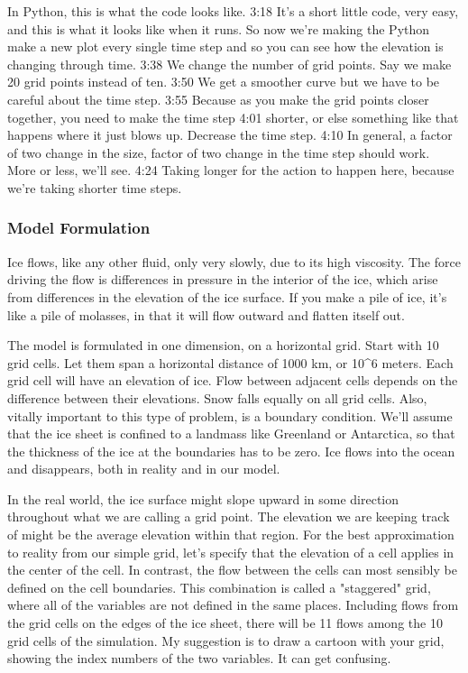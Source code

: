 {In Python, this is what the code looks like. 
3:18
It's a short little code, very easy, and this is what it looks like when it runs. So now we're making the Python make a new plot every single time step and so you can see how the elevation is changing through time. 
3:38
We change the number of grid points. Say we make 20 grid points instead of ten. 
3:50
We get a smoother curve but we have to be careful about the time step. 
3:55
Because as you make the grid points closer together, you need to make the time step 
4:01
shorter, or else something like that happens where it just blows up. Decrease the time step. 
4:10
In general, a factor of two change in the size, factor of two change in the time step should work. More or less, we'll see. 
4:24
Taking longer for the action to happen here, because we're taking shorter time steps. 

\subsubsection{Model Formulation}\index{}
Ice flows, like any other fluid, only very slowly, due to its high viscosity. The force driving the flow is differences in pressure in the interior of the ice, which arise from differences in the elevation of the ice surface. If you make a pile of ice, it's like a pile of molasses, in that it will flow outward and flatten itself out.

The model is formulated in one dimension, on a horizontal grid. Start with 10 grid cells. Let them span a horizontal distance of 1000 km, or 10^6 meters. Each grid cell will have an elevation of ice. Flow between adjacent cells depends on the difference between their elevations. Snow falls equally on all grid cells. Also, vitally important to this type of problem, is a boundary condition. We'll assume that the ice sheet is confined to a landmass like Greenland or Antarctica, so that the thickness of the ice at the boundaries has to be zero. Ice flows into the ocean and disappears, both in reality and in our model.

In the real world, the ice surface might slope upward in some direction throughout what we are calling a grid point. The elevation we are keeping track of might be the average elevation within that region. For the best approximation to reality from our simple grid, let's specify that the elevation of a cell applies in the center of the cell. In contrast, the flow between the cells can most sensibly be defined on the cell boundaries. This combination is called a "staggered" grid, where all of the variables are not defined in the same places. Including flows from the grid cells on the edges of the ice sheet, there will be 11 flows among the 10 grid cells of the simulation. My suggestion is to draw a cartoon with your grid, showing the index numbers of the two variables. It can get confusing.

}

